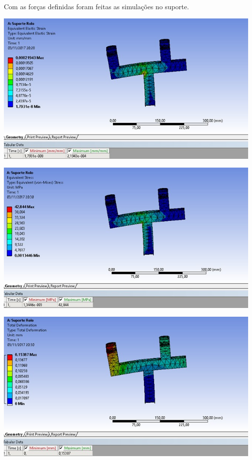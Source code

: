 Com as forças definidas foram feitas as simulações no suporte.
    \begin{center}
    	\includegraphics[scale=0.7]{figuras/sim_estatica_5}
        \label{sim_estatica_5}
    \end{center} 
     \begin{center}
    	\includegraphics[scale=0.7]{figuras/stress_5}
        \label{stress_5}
    \end{center} 
    \begin{center}
    	\includegraphics[scale=0.7]{figuras/deformacao_3}
        \label{deformacao_3}
    \end{center} 
